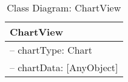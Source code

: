 \begin{table}[H]
\centering
\caption{Class Diagram: ChartView}

\hspace{1em}
\renewcommand{\arraystretch}{1.7}

\begin{tabular}{|l|}
\hline
\textbf{ChartView} \\
\hline
– chartType: Chart \\
– chartData: [AnyObject] \\
\hline
\end{tabular}
\end{table}
